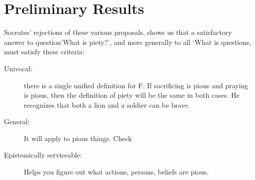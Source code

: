 \documentclass[11pt]{article}
\begin{document}
\section*{Preliminary Results}

Socrates' rejections of these various proposals, shows us that a satisfactory answer to question`What is piety?', and more generally to all `What is questions, must satisfy these criteria: 
\begin{description}
\item[Univocal:] there is a single unified definition for F. If sacrificing is pious and praying is pious, then the definition of piety will be the same in both cases. He recognizes that both a lion and a soldier can be brave.
\item[General:] It will apply to pious things. Check
\item[Epistemically serviceable:] Helps you figure out what actions, persons, beliefs are pious.
\end{description}
\end{document}

